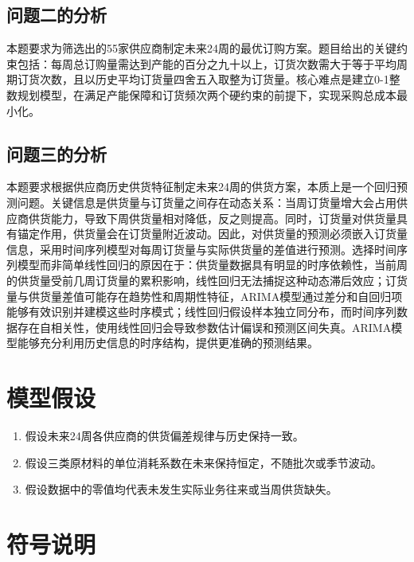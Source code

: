 \documentclass[12pt,a4paper]{ctexart}
\theoremstyle{definition}
\theoremstyle{plain}
\theoremstyle{remark}
\begin{document}
\subsection{问题二的分析}

本题要求为筛选出的55家供应商制定未来24周的最优订购方案。题目给出的关键约束包括：每周总订购量需达到产能的百分之九十以上，订货次数需大于等于平均周期订货次数，且以历史平均订货量四舍五入取整为订货量。核心难点是建立0-1整数规划模型，在满足产能保障和订货频次两个硬约束的前提下，实现采购总成本最小化。

\subsection{问题三的分析}

本题要求根据供应商历史供货特征制定未来24周的供货方案，本质上是一个回归预测问题。关键信息是供货量与订货量之间存在动态关系：当周订货量增大会占用供应商供货能力，导致下周供货量相对降低，反之则提高。同时，订货量对供货量具有锚定作用，供货量会在订货量附近波动。因此，对供货量的预测必须嵌入订货量信息，采用时间序列模型对每周订货量与实际供货量的差值进行预测。选择时间序列模型而非简单线性回归的原因在于：供货量数据具有明显的时序依赖性，当前周的供货量受前几周订货量的累积影响，线性回归无法捕捉这种动态滞后效应；订货量与供货量差值可能存在趋势性和周期性特征，ARIMA模型通过差分和自回归项能够有效识别并建模这些时序模式；线性回归假设样本独立同分布，而时间序列数据存在自相关性，使用线性回归会导致参数估计偏误和预测区间失真。ARIMA模型能够充分利用历史信息的时序结构，提供更准确的预测结果。

\section{模型假设}

\begin{enumerate}[label=\arabic*.]
  \item 假设未来24周各供应商的供货偏差规律与历史保持一致。
  \item 假设三类原材料的单位消耗系数在未来保持恒定，不随批次或季节波动。
  \item 假设数据中的零值均代表未发生实际业务往来或当周供货缺失。
\end{enumerate}


\section{符号说明}
\end{document}

